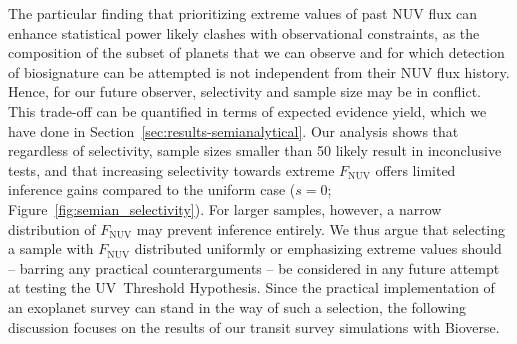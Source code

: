 \documentclass[twocolumn,twocolappendix,linenumbers]{aastex631}
\begin{document}
The particular finding that prioritizing extreme values of past \gls{NUV} flux can enhance statistical power likely clashes with observational constraints, as the composition of the subset of planets that we can observe and for which detection of biosignature can be attempted is not independent from their \gls{NUV} flux history.
Hence, for our future observer, selectivity and sample size may be in conflict.
This trade-off can be quantified in terms of expected evidence yield, which we have done in Section~\ref{sec:results-semianalytical}.
Our analysis shows that regardless of selectivity, sample sizes smaller than 50 likely result in inconclusive tests, and that increasing selectivity towards extreme $F_{\mathrm{NUV}}$ offers limited inference gains compared to the uniform case ($s=0$; Figure~\ref{fig:semian_selectivity}).
For larger samples, however, a narrow distribution of $F_{\mathrm{NUV}}$ may prevent inference entirely.
We thus argue that selecting a sample with $F_{\mathrm{NUV}}$ distributed uniformly or emphasizing extreme values should -- barring any practical counterarguments -- be considered in any future attempt at testing the UV~Threshold Hypothesis.
Since the practical implementation of an exoplanet survey can stand in the way of such a selection, the following discussion focuses on the results of our transit survey simulations with Bioverse.



\end{document}
